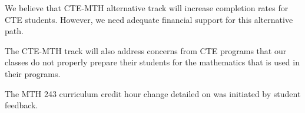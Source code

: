 We believe that CTE-MTH alternative track will increase completion rates for
CTE students. However, we need adequate financial support for this alternative
path.

The CTE-MTH track will also address concerns from CTE programs that our classes
do not properly prepare their students for the mathematics that is used in
their programs.

The MTH 243 curriculum credit hour change detailed on  
was initiated by student feedback.
